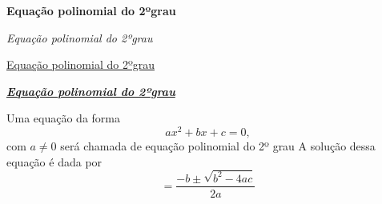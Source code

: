 \documentclass[a4paper, 12pt]{article}
\begin{document}
\begin{center}
 \textbf{Equação polinomial do 2ºgrau}
\end{center}
 
\begin{flushright}
 \textit{Equação polinomial do 2ºgrau}
\end{flushright}
 
\begin{flushleft}
 \underline{Equação polinomial do 2ºgrau}
\end{flushleft}

\begin{flushleft}
 \textbf{\textit{\underline{Equação polinomial do 2ºgrau}}}
\end{flushleft} 

 Uma equação da forma $$ax^2 + bx + c = 0,$$ com $a \neq 0$ será chamada de equação polinomial do 2º grau
 A solução dessa equação é dada por 
 $$ = \frac{-b \pm \sqrt{b^2 - 4ac}}{2a}$$ 
\end{document}
